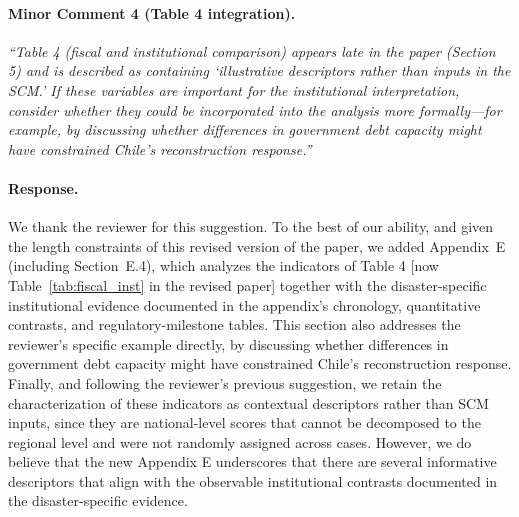 \paragraph{Minor Comment 4 (Table 4 integration).}
\textit{``Table 4 (fiscal and institutional comparison) appears late in the paper (Section 5) and is described as containing `illustrative descriptors rather than inputs in the SCM.' If these variables are important for the institutional interpretation, consider whether they could be incorporated into the analysis more formally---for example, by discussing whether differences in government debt capacity might have constrained Chile's reconstruction response.''}

\paragraph{Response.} We thank the reviewer for this suggestion. To the best of our ability, and given the length constraints of this revised version of the paper, we added Appendix~E (including Section~E.4), which analyzes the indicators of Table 4 [now Table~\ref{tab:fiscal_inst} in the revised paper] together with the disaster-specific institutional evidence documented in the appendix's chronology, quantitative contrasts, and regulatory-milestone tables. This section also addresses the reviewer's specific example directly, by discussing whether differences in government debt capacity might have constrained Chile's reconstruction response. Finally, and following the reviewer's previous suggestion, we retain the characterization of these indicators as contextual descriptors rather than SCM inputs, since they are national-level scores that cannot be decomposed to the regional level and were not randomly assigned across cases. However, we do believe that the new Appendix E underscores that there are several informative descriptors that align with the observable institutional contrasts documented in the disaster-specific evidence.
